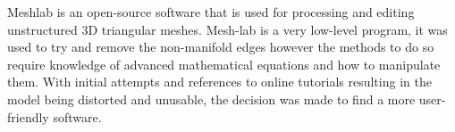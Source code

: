 Meshlab is an open-source software that is used for processing and editing unstructured 3D triangular meshes. Mesh-lab is a very low-level program,  it was used to try and remove the non-manifold edges however the methods to do so require knowledge of advanced mathematical equations and how to manipulate them. With initial attempts and references to online tutorials resulting in the model being distorted and unusable, the decision was made to find a more user-friendly software.


